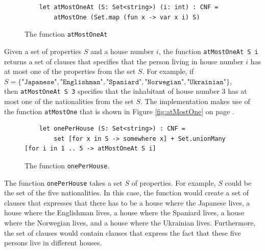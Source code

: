 \begin{figure}[!ht]
\centering
\begin{verbatim}
    let atMostOneAt (S: Set<string>) (i: int) : CNF =
        atMostOne (Set.map (fun x -> var x i) S)
\end{verbatim}
\vspace*{-0.3cm}
\caption{The function \texttt{atMostOneAt}}
\label{fig:atMostOneAt}
\end{figure}

Given a set of properties $S$ and a house number $i$, the function
\texttt{atMostOneAt S i} returns a set of clauses that specifies that the
person living in house number $i$ has at most one of the properties from the set
$S$.  For example, if  
\\[0.2cm]
\hspace*{1.3cm}
$S = \{\texttt{"Japanese"}, \texttt{"Englishman"}, \texttt{"Spaniard"}, \texttt{"Norwegian"}, \texttt{"Ukrainian"}\}$, 
\\[0.2cm]
then \texttt{atMostOneAt S 3} specifies that the inhabitant of house number 3
has at most one of the nationalities from the set $S$.   The implementation
makes use of the function \texttt{atMostOne} that is shown in Figure
\ref{fig:atMostOne} on page \pageref{fig:atMostOne}.

\begin{figure}[!ht]
\centering
\begin{verbatim}
    let onePerHouse (S: Set<string>) : CNF =
        set [for x in S -> somewhere x] + Set.unionMany [for i in 1 .. 5 -> atMostOneAt S i]
\end{verbatim}
\vspace*{-0.3cm}
\caption{The function \texttt{onePerHouse}.}
\label{fig:onePerHouse}
\end{figure}

The function \texttt{onePerHouse} takes a set $S$ of properties.  For
example, $S$ could be the set of the five nationalities.
In this case, the function would create a set of clauses that expresses that
there has to be a house where the Japanese lives, a house where the Englishman
lives, a house where the Spaniard lives, a house where the Norwegian lives, and
a house where the Ukrainian lives.  Furthermore, the set of clauses would contain
clauses that express the fact that these five persons live in different houses.


